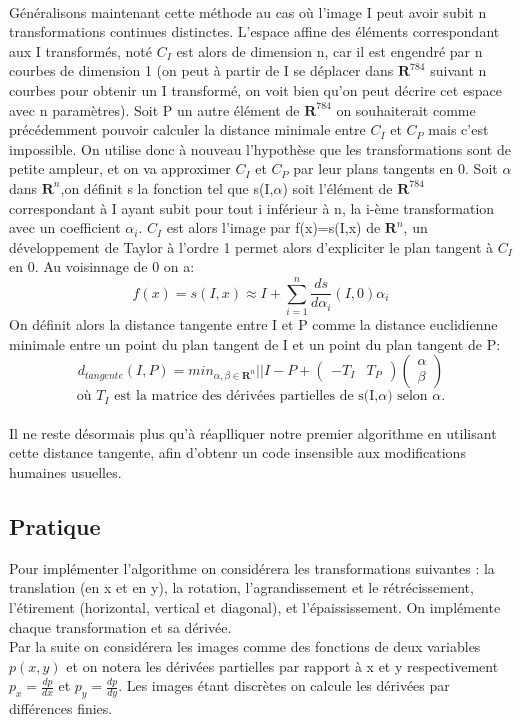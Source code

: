 \documentclass[a4paper,11pt,twoside]{report}
\begin{document}
 \\
Généralisons maintenant cette méthode au cas où l'image I peut avoir subit n transformations continues distinctes. L'espace affine des éléments correspondant aux I transformés, noté $C_{I}$ est alors de dimension n, car il est engendré par n courbes de dimension 1 (on peut à partir de I se déplacer dans $\textbf{R}^{784}$ suivant n courbes pour obtenir un I transformé, on voit bien qu'on peut décrire cet espace avec n paramètres). Soit P un autre élément de $\textbf{R}^{784}$ on souhaiterait comme précédemment pouvoir calculer la distance minimale entre $C_{I}$ et $C_{P}$ mais c'est impossible. On utilise donc à nouveau l'hypothèse que les transformations sont de petite ampleur, et on va approximer $C_{I}$ et $C_{P}$ par leur plans tangents en 0. Soit $\alpha$ dans $\textbf{R}^{n}$,on définit s la fonction tel que s(I,$\alpha$) soit l'élément de $\textbf{R}^{784}$ correspondant à I ayant subit pour tout i inférieur à n, la i-ème transformation avec un coefficient $\alpha_{i}$. $C_{I}$ est alors l'image par f(x)=s(I,x) de $\textbf{R}^{n}$, un développement de Taylor à l'ordre 1 permet alors d'expliciter le plan tangent à $C_{I}$ en 0. Au voisinnage de 0 on a:$$f(x) = s(I,x) \approx I + \sum_{i=1}^{n}\frac{ds}{d\alpha_{i}}(I,0)\alpha_{i}$$ On définit alors la distance tangente entre I et P comme la distance euclidienne minimale entre un point du plan tangent de I et un point du plan tangent de P:$$d_{tangente}(I,P)=min_{\alpha,\beta \in \textbf{R}^{n}}||I-P+\begin{pmatrix}-T_{I} & T_{P}\end{pmatrix} \begin{pmatrix}\alpha \\ \beta\end{pmatrix}$$ $$\textrm{où $T_{I}$ est la matrice des dérivées partielles de s(I,$\alpha$) selon $\alpha$.}$$\\
Il ne reste désormais plus qu'à réaplliquer notre premier algorithme en utilisant cette distance tangente, afin d'obtenr un code insensible aux modifications humaines usuelles.

\subsection{Pratique}

Pour implémenter l'algorithme on considérera les transformations suivantes : la translation (en x et en y), la rotation, l'agrandissement et le rétrécissement, l'étirement (horizontal, vertical et diagonal), et l'épaississement. On implémente chaque transformation et sa dérivée.\\
Par la suite on considérera les images comme des fonctions de deux variables $p(x,y)$ et on notera les dérivées partielles par rapport à x et y respectivement $p_x = \frac{dp}{dx}$ et $p_y = \frac{dp}{dy}$. Les images étant discrètes on calcule les dérivées par différences finies. 
\end{document}
